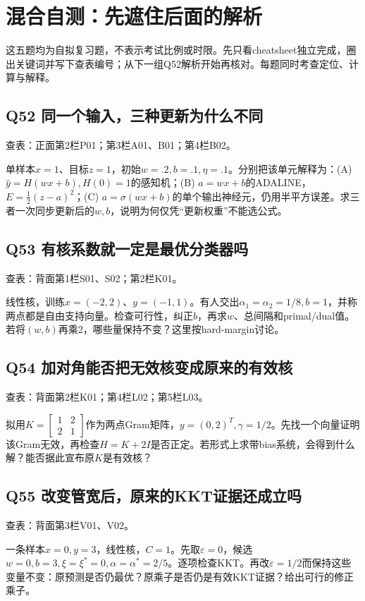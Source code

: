 \clearpage\section*{混合自测：先遮住后面的解析}
这五题均为自拟复习题，不表示考试比例或时限。先只看cheatsheet独立完成，圈出关键词并写下查表编号；从下一组Q52解析开始再核对。每题同时考查定位、计算与解释。

\subsection*{Q52 同一个输入，三种更新为什么不同}
查表：正面第2栏P01；第3栏A01、B01；第4栏B02。

单样本$x=1$、目标$z=1$，初始$w=.2,b=.1,\eta=.1$。分别把该单元解释为：(A) $\hat y=H(wx+b),H(0)=1$的感知机；(B) $a=wx+b$的ADALINE，$E=\frac12(z-a)^2$；(C) $a=\sigma(wx+b)$的单个输出神经元，仍用半平方误差。求三者一次同步更新后的$w,b$，说明为何仅凭“更新权重”不能选公式。

\subsection*{Q53 有核系数就一定是最优分类器吗}
查表：背面第1栏S01、S02；第2栏K01。

线性核，训练$x=(-2,2)$、$y=(-1,1)$。有人交出$\alpha_1=\alpha_2=1/8,b=1$，并称两点都是自由支持向量。检查可行性，纠正$b$，再求$w$、总间隔和primal/dual值。若将$(w,b)$再乘2，哪些量保持不变？这里按hard-margin讨论。

\subsection*{Q54 加对角能否把无效核变成原来的有效核}
查表：背面第2栏K01；第4栏L02；第5栏L03。

拟用$K=\left[\begin{smallmatrix}1&2\\2&1\end{smallmatrix}\right]$作为两点Gram矩阵，$y=(0,2)^T,\gamma=1/2$。先找一个向量证明该Gram无效，再检查$H=K+2I$是否正定。若形式上求带bias系统，会得到什么解？能否据此宣布原$K$是有效核？

\subsection*{Q55 改变管宽后，原来的KKT证据还成立吗}
查表：背面第3栏V01、V02。

一条样本$x=0,y=3$，线性核，$C=1$。先取$\varepsilon=0$，候选$w=0,b=3,\xi=\xi^*=0,\alpha=\alpha^*=2/5$。逐项检查KKT。再改$\varepsilon=1/2$而保持这些变量不变：原预测是否仍最优？原乘子是否仍是有效KKT证据？给出可行的修正乘子。

